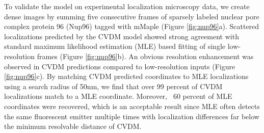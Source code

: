 To validate the model on experimental localization microscopy data, we create dense images by summing five consecutive frames of sparsely labeled nuclear pore complex protein 96 (Nup96) tagged with mMaple \parencite{Speiser2021} (Figure \ref{fig:nup96}a). Scattered localizations predicted by the CVDM model showed strong agreement with standard maximum likelihood estimation (MLE) based fitting of single low-resolution frames (Figure \ref{fig:nup96}b). An obvious resolution enhancement was observed in CVDM predictions compared to low-resolution inputs (Figure \ref{fig:nup96}c). By matching CVDM predicted coordinates to MLE localizations using a search radius of 50nm, we find that over 99 percent of CVDM localizations match to a MLE coordinate. Moreover, ~60 percent of MLE coordinates were recovered, which is an acceptable result since MLE often detects the same fluorescent emitter multiple times with localization differences far below the minimum resolvable distance of CVDM. 






